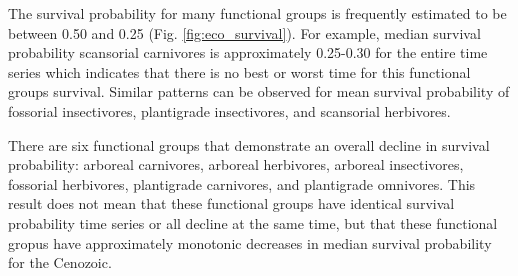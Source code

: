 \documentclass[12pt,letterpaper]{article}
\begin{document}
The survival probability for many functional groups is frequently estimated to be between 0.50 and 0.25 (Fig. \ref{fig:eco_survival}). For example, median survival probability scansorial carnivores is approximately 0.25-0.30 for the entire time series which indicates that there is no best or worst time for this functional groups survival. Similar patterns can be observed for mean survival probability of fossorial insectivores, plantigrade insectivores, and scansorial herbivores.

There are six functional groups that demonstrate an overall decline in survival probability: arboreal carnivores, arboreal herbivores, arboreal insectivores, fossorial herbivores, plantigrade carnivores, and plantigrade omnivores. This result does not mean that these functional groups have identical survival probability time series or all decline at the same time, but that these functional gropus have approximately monotonic decreases in median survival probability for the Cenozoic.
\end{document}

